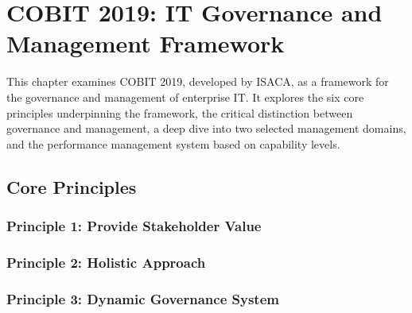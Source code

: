 
\chapter{COBIT 2019: IT Governance and Management Framework}

This chapter examines COBIT 2019, developed by ISACA, as a framework for the governance and management of enterprise IT. It explores the six core principles underpinning the framework, the critical distinction between governance and management, a deep dive into two selected management domains, and the performance management system based on capability levels.

\section{Core Principles}

\subsection{Principle 1: Provide Stakeholder Value}





\subsection{Principle 2: Holistic Approach}





\subsection{Principle 3: Dynamic Governance System}


